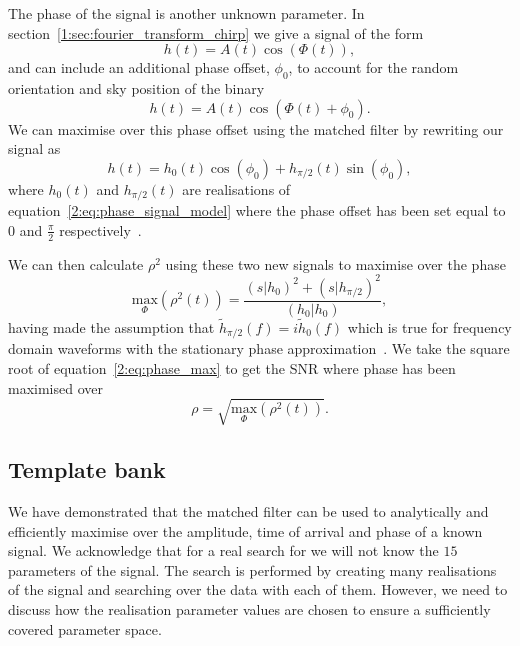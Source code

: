 The phase of the \gwadj signal is another unknown parameter. In section~\ref{1:sec:fourier_transform_chirp} we give a signal of the form
%
\begin{equation}
    h(t) = A(t) \cos\left(\Phi(t)\right),
\end{equation}
%
and can include an additional phase offset, $\phi_{0}$, to account for the random orientation and sky position of the binary
%
\begin{equation}
    h(t) = A(t) \cos\left(\Phi(t) + \phi_{0}\right).
    \label{2:eq:phase_signal_model}
\end{equation}
%
We can maximise over this phase offset using the matched filter by rewriting our signal as
%
\begin{equation}
    h(t) = h_{0}(t) \cos(\phi_{0}) + h_{\pi/2}(t)\sin(\phi_{0}),
\end{equation}
%
where $h_{0}(t)$ and $h_{\pi/2}(t)$ are realisations of equation~\ref{2:eq:phase_signal_model} where the phase offset has been set equal to $0$ and $\frac{\pi}{2}$ respectively~\cite{IHOPE:2012zx}.

We can then calculate $\rho^{2}$ using these two new signals to maximise over the phase
%
\begin{equation}
    \underset{\Phi}{\text{max}}(\rho^{2}(t)) = \frac{(s|h_{0})^{2} + (s|h_{\pi/2})^2}{(h_{0}|h_{0})},
    \label{2:eq:phase_max}
\end{equation}
%
having made the assumption that $\tilde{h}_{\pi/2}(f) = i\tilde{h}_{0}(f)$ which is true for frequency domain waveforms with the stationary phase approximation~\cite{Droz:1999}. We take the square root of equation~\ref{2:eq:phase_max} to get the SNR where phase has been maximised over
\begin{equation}
    \rho = \sqrt{\underset{\Phi}{\text{max}}(\rho^{2}(t))}.
\end{equation}

\subsection{\label{2:sec:template-bank}Template bank}

We have demonstrated that the matched filter can be used to analytically and efficiently maximise over the amplitude, time of arrival and phase of a known signal. We acknowledge that for a real search for \gws we will not know the $15$ parameters of the signal. The search is performed by creating many realisations of the \gwadj signal and searching over the data with each of them. However, we need to discuss how the realisation parameter values are chosen to ensure a sufficiently covered parameter space.

